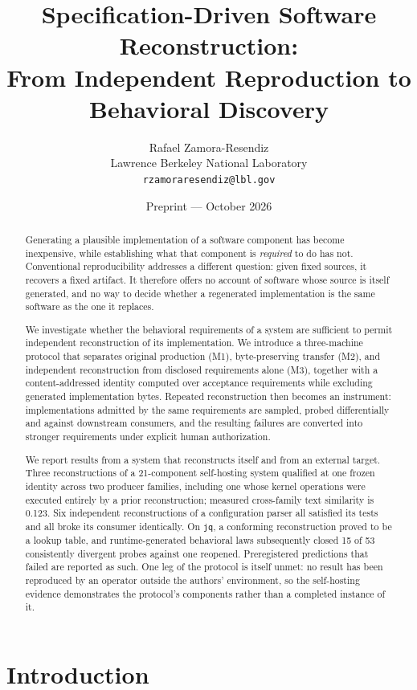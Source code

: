 \documentclass[10pt,twocolumn]{article}
\title{\bf Specification-Driven Software Reconstruction:\\
From Independent Reproduction to Behavioral Discovery}
\author{Rafael Zamora-Resendiz\\
\small Lawrence Berkeley National Laboratory\\
\small \texttt{rzamoraresendiz@lbl.gov}}
\date{Preprint --- October 2026}
\begin{document}
\maketitle

\begin{abstract}
\noindent
Generating a plausible implementation of a software component has become
inexpensive, while establishing what that component is \emph{required} to
do has not. Conventional reproducibility addresses a different question:
given fixed sources, it recovers a fixed artifact. It therefore offers no
account of software whose source is itself generated, and no way to decide
whether a regenerated implementation is the same software as the one it
replaces.

We investigate whether the behavioral requirements of a system are
sufficient to permit independent reconstruction of its implementation. We
introduce a three-machine protocol that separates original production
(M1), byte-preserving transfer (M2), and independent reconstruction from
disclosed requirements alone (M3), together with a content-addressed
identity computed over acceptance requirements while excluding generated
implementation bytes. Repeated reconstruction then becomes an instrument:
implementations admitted by the same requirements are sampled, probed
differentially and against downstream consumers, and the resulting
failures are converted into stronger requirements under explicit human
authorization.

We report results from a system that reconstructs itself and from an
external target. Three reconstructions of a 21-component self-hosting
system qualified at one frozen identity across two producer families,
including one whose kernel operations were executed entirely by a prior
reconstruction; measured cross-family text similarity is 0.123. Six
independent reconstructions of a configuration parser all satisfied its
tests and all broke its consumer identically. On \texttt{jq}, a
conforming reconstruction proved to be a lookup table, and runtime-generated
behavioral laws subsequently closed 15 of 53 consistently divergent probes
against one reopened. Preregistered predictions that failed are reported
as such. One leg of the protocol is itself unmet: no result has been
reproduced by an operator outside the authors' environment, so the
self-hosting evidence demonstrates the protocol's components rather than
a completed instance of it.
\end{abstract}

\section{Introduction}
\label{sec:intro}
\end{document}
